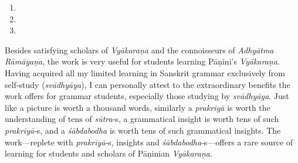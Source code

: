 \begin{enumerate}[itemsep=0mm,label={{\engtextfont \arabic*.}}]
\item \begin{sloppypar}\justifying{}\end{sloppypar}
\item \begin{sloppypar}\justifying{}\end{sloppypar}
\item \begin{sloppypar}\justifying{}\end{sloppypar}
\end{enumerate}
\begin{sloppypar}\justifying\noindent\hspace{10mm} {\engtextfont Besides satisfying scholars of \textit{Vyākaraṇa} and the connoisseurs of \textit{Adhyātma Rāmāyaṇa}, the work is very useful for students learning Pāṇini’s \textit{Vyākaraṇa}. Having acquired all my limited learning in Sanskrit grammar exclusively from self-study (\textit{svādhyāya}), I can personally attest to the extraordinary benefits the work offers for grammar students, especially those studying by \textit{svādhyāya}. Just like a picture is worth a thousand words, similarly a \textit{prakriyā} is worth the understanding of tens of \textit{sūtra}‑s, a grammatical insight is worth tens of such \textit{prakriyā}‑s, and a \textit{śābdabodha} is worth tens of such grammatical insights. The work—replete with \textit{prakriyā}‑s, insights and \textit{śābdabodha}‑s—offers a rare source of learning for students and scholars of Pāṇinian \textit{Vyākaraṇa}.}\end{sloppypar}
